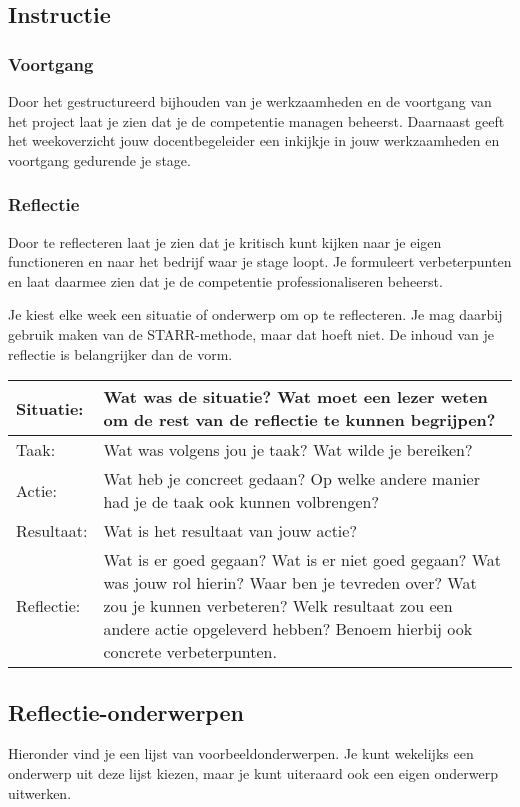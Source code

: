 \documentclass[a4paper,12pt]{article}
\begin{document}
\subsection*{Instructie}

\subsubsection*{Voortgang}
Door het gestructureerd bijhouden van je werkzaamheden en de voortgang van het project laat je zien dat je de competentie managen beheerst. Daarnaast geeft het weekoverzicht jouw docentbegeleider een inkijkje in jouw werkzaamheden en voortgang gedurende je stage.

\subsubsection*{Reflectie}
Door te reflecteren laat je zien dat je kritisch kunt kijken naar je eigen functioneren en naar het bedrijf waar je stage loopt. Je formuleert verbeterpunten en laat daarmee zien dat je de competentie professionaliseren beheerst.

Je kiest elke week een situatie of onderwerp om op te reflecteren. Je mag daarbij gebruik maken van de STARR-methode, maar dat hoeft niet. De inhoud van je reflectie is belangrijker dan de vorm.

\begin{longtable}{|l|p{}|}
\hline
Situatie:   & Wat was de situatie? Wat moet een lezer weten om de rest van de reflectie te kunnen begrijpen? \\ \hline
Taak:   & Wat was volgens jou je taak? Wat wilde je bereiken?  \\ \hline
Actie:  & Wat heb je concreet gedaan? Op welke andere manier had je de taak ook kunnen volbrengen? \\ \hline
Resultaat: & Wat is het resultaat van jouw actie? \\ \hline
Reflectie:   & Wat is er goed gegaan? Wat is er niet goed gegaan? Wat was jouw rol hierin? Waar ben je tevreden over? Wat zou je kunnen verbeteren? Welk resultaat zou een andere actie opgeleverd hebben? Benoem hierbij ook concrete verbeterpunten. \\ \hline

\hline

\end{longtable}

\subsection*{Reflectie-onderwerpen}
Hieronder vind je een lijst van voorbeeldonderwerpen. Je kunt wekelijks een onderwerp uit deze lijst kiezen, maar je kunt uiteraard ook een eigen onderwerp uitwerken.
\end{document}
